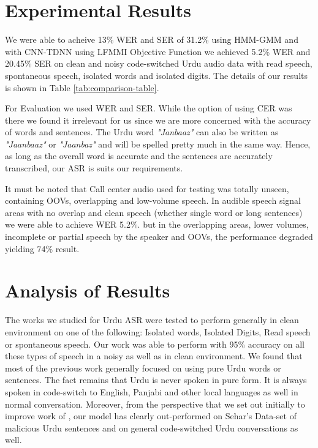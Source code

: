 \documentclass[3p,times]{elsarticle}
\begin{document}
\section{Experimental Results}
\label{sec:experimental-results}
We were able to acheive 13\% WER and SER of 31.2\% using HMM-GMM and with CNN-TDNN using LFMMI Objective Function we achieved 5.2\% WER and 20.45\% SER on clean and noisy code-switched Urdu audio data with read speech, spontaneous speech, isolated words and isolated digits. The details of our results is shown in Table \ref{tab:comparison-table}. 

For Evaluation we used WER and SER. While the option of using CER was there we found it irrelevant for us since we are more concerned with the accuracy of words and sentences. The Urdu word \textit{"Janbaaz"} can also be written as \textit{"Jaanbaaz"} or \textit{"Jaanbaz"} and will be spelled pretty much in the same way. Hence, as long as the overall word is accurate and the sentences are accurately transcribed, our ASR is suits our requirements.

It must be noted that Call center audio used for testing was totally unseen, containing OOVs, overlapping and low-volume speech. In audible speech signal areas with no overlap and clean speech (whether single word or long sentences) we were able to achieve WER 5.2\%. but in the overlapping areas, lower volumes, incomplete or partial speech by the speaker and OOVs, the performance degraded yielding 74\% result. 

\section{Analysis of Results}
\label{se:discussion}

The works we studied for Urdu ASR were tested to perform generally in clean environment on one of the following: Isolated words, Isolated Digits, Read speech or spontaneous speech. Our work was able to perform with 95\% accuracy on all these types of speech in a noisy as well as in clean environment. We found that most of the previous work generally focused on using pure Urdu words or sentences. The fact remains that Urdu is never spoken in pure form. It is always spoken in code-switch to English, Panjabi and other local languages as well in normal conversation. Moreover, from the perspective that we set out initially to improve work of \cite{sehar_gul_detecting_2020}, our model has clearly out-performed on Sehar's Data-set of malicious Urdu sentences and on general code-switched Urdu conversations as well. 
\end{document}
